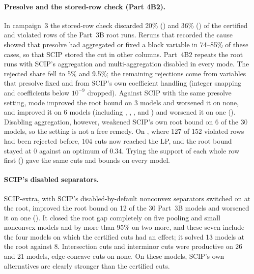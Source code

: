 \paragraph{Presolve and the stored-row check (Part 4B2).} In campaign~3 the
stored-row check discarded 20\% () and 36\% () of the
certified and violated rows of the Part~3B root runs. Reruns that recorded the
cause showed that presolve had aggregated or fixed a block variable in 74--85\%
of these cases, so that SCIP stored the cut in other columns. Part~4B2 repeats
the root runs with SCIP's aggregation and multi-aggregation disabled in every
mode. The rejected share fell to 5\% and 9.5\%; the remaining rejections come
from variables that presolve fixed and from SCIP's own coefficient handling
(integer snapping and coefficients below $10^{-9}$ dropped). Against SCIP with
the same presolve setting, mode  improved the root bound on 3 models
and worsened it on none, and  improved it on 6 models
(including , ,
,  and ) and worsened it on one
(). Disabling aggregation, however, weakened SCIP's
own root bound on 6 of the 30 models, so the setting is not a free remedy. On
, where 127 of 152 violated rows had been
rejected before, 104 cuts now reached the LP, and the root bound stayed at $0$
against an optimum of $0.34$. Trying the support of each whole row first
() gave the same cuts and bounds on every model.

\paragraph{SCIP's disabled separators.} SCIP-extra, with SCIP's
disabled-by-default nonconvex separators switched on at the root, improved the
root bound on 12 of the 30 Part~3B models and worsened it on one
(). It closed the root gap completely on five pooling and small
nonconvex models and by more than 95\% on two more, and these seven include
the four models on which the certified cuts had an effect; it solved 13 models
at the root against 8. Intersection cuts and interminor cuts were productive
on 26 and 21 models, edge-concave cuts on none. On these models, SCIP's own
alternatives are clearly stronger than the certified cuts.

